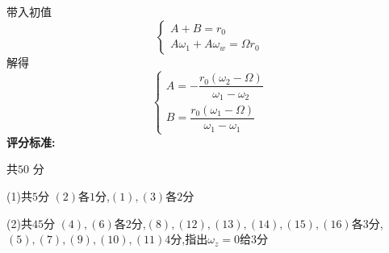 \documentclass{article}
\begin{document}
带入初值
\[
\begin{cases}
    A+B=r_0\\
    A\omega _{1}+A\omega _{w}=\Omega r_{0}
\end{cases}
\tag{15}
\]
解得
\[
\begin{cases}
A=-\dfrac{r_{0}\left( \omega _{2}-\Omega \right) }{\omega _{1}-\omega _{2}}\\
B=\dfrac{r_{0}\left( \omega _{1}-\Omega \right) }{\omega _{1}-\omega _{1}}
\end{cases}
\tag{16}
\]
\textbf{评分标准:}\par
共$50$ 分\par
(1)共$5$分 $(2)$各$1$分,$(1),(3)$各$2$分\par
(2)共$45$分 $(4),(6)$各$2$分,$(8),(12),(13),(14),(15),(16)$各$3$分,$(5),(7),(9),(10),(11)$$4$分,指出$\omega_z=0$给$3$分\par
\end{document}
